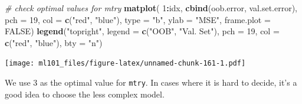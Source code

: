 \documentclass[]{article}
\newenvironment{Shaded}{\begin{snugshade}}{\end{snugshade}}
\newcommand{\CommentTok}[1]{\textcolor[rgb]{0.56,0.35,0.01}{\textit{#1}}}
\newcommand{\DataTypeTok}[1]{\textcolor[rgb]{0.13,0.29,0.53}{#1}}
\newcommand{\DecValTok}[1]{\textcolor[rgb]{0.00,0.00,0.81}{#1}}
\newcommand{\KeywordTok}[1]{\textcolor[rgb]{0.13,0.29,0.53}{\textbf{#1}}}
\newcommand{\NormalTok}[1]{#1}
\newcommand{\OperatorTok}[1]{\textcolor[rgb]{0.81,0.36,0.00}{\textbf{#1}}}
\newcommand{\OtherTok}[1]{\textcolor[rgb]{0.56,0.35,0.01}{#1}}
\newcommand{\StringTok}[1]{\textcolor[rgb]{0.31,0.60,0.02}{#1}}
\begin{document}
\begin{Shaded}
\begin{Highlighting}[]
\CommentTok{# check optimal values for mtry}
\KeywordTok{matplot}\NormalTok{( }\DecValTok{1}\OperatorTok{:}\NormalTok{idx, }\KeywordTok{cbind}\NormalTok{(oob.error, val.set.error), }\DataTypeTok{pch =} \DecValTok{19}\NormalTok{, }\DataTypeTok{col =} \KeywordTok{c}\NormalTok{(}\StringTok{"red"}\NormalTok{, }\StringTok{"blue"}\NormalTok{),}
         \DataTypeTok{type =} \StringTok{"b"}\NormalTok{, }\DataTypeTok{ylab =} \StringTok{"MSE"}\NormalTok{, }\DataTypeTok{frame.plot =} \OtherTok{FALSE}\NormalTok{)}
\KeywordTok{legend}\NormalTok{(}\StringTok{"topright"}\NormalTok{, }\DataTypeTok{legend =} \KeywordTok{c}\NormalTok{(}\StringTok{"OOB"}\NormalTok{, }\StringTok{"Val. Set"}\NormalTok{), }\DataTypeTok{pch =} \DecValTok{19}\NormalTok{, }\DataTypeTok{col =} \KeywordTok{c}\NormalTok{(}\StringTok{"red"}\NormalTok{, }\StringTok{"blue"}\NormalTok{),}
       \DataTypeTok{bty =} \StringTok{"n"}\NormalTok{)}
\end{Highlighting}
\end{Shaded}

\texttt{[image: ml101\_files/figure-latex/unnamed-chunk-161-1.pdf]}

We use 3 as the optimal value for \texttt{mtry}. In cases where it is hard to decide, it's a good idea to choose the less complex model.

\begin{Shaded}
\end{Shaded}
\end{document}
